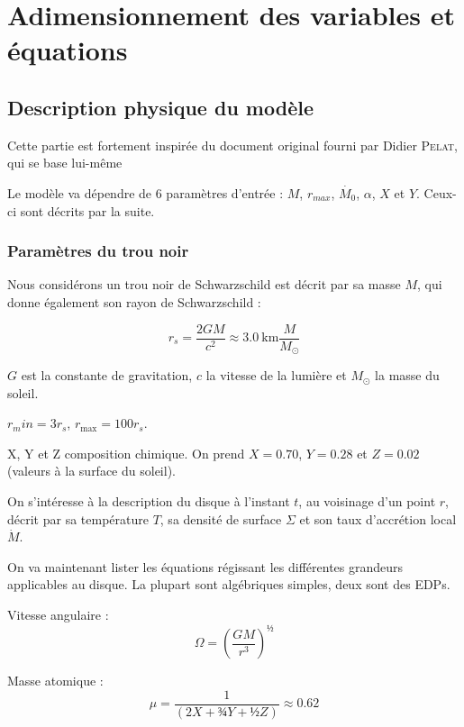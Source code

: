 \section{Adimensionnement des variables et équations}

\subsection{Description physique du modèle}

Cette partie est fortement inspirée du document original fourni par Didier
\textsc{Pelat}, qui se base lui-même

Le modèle va dépendre de 6 paramètres d’entrée : $M$, $r_{max}$, $\dot{M_0}$, $\alpha$,
$X$ et $Y$. Ceux-ci sont décrits par la suite.

\subsubsection{Paramètres du trou noir}

Nous considérons un trou noir de Schwarzschild est décrit par sa masse $M$, qui donne également son rayon de Schwarzschild :

\begin{equation}
    r_s = \frac{2 G M}{c^2} \approx \SI{3.0}{\kilo\meter} \frac{M}{M_{\odot}}
\end{equation}

$G$ est la constante de gravitation, $c$ la vitesse de la lumière et $M_{\odot}$ la masse du soleil.

$r_min = 3 r_s$, $r_\mathrm{max} = 100 r_s$.

X, Y et Z composition chimique. On prend $X = \num{0.70}$, $Y = \num{0.28}$ et $Z = \num{0.02}$ (valeurs à la surface du soleil).

On s’intéresse à la description du disque à l’instant $t$, au voisinage d’un point $r$, décrit par sa température $T$, sa densité de surface $\Sigma$ et son taux d’accrétion local $\dot{M}$.

On va maintenant lister les équations régissant les différentes grandeurs applicables au disque. La plupart sont algébriques simples, deux sont des EDPs.

Vitesse angulaire : 
\begin{equation}
    \Omega = \left( \frac{G M}{r^3} \right)^½
\end{equation}

Masse atomique :
\begin{equation}
    \mu = \frac{1}{\left(2X + ¾Y + ½Z\right)} \approx 0.62
\end{equation}

